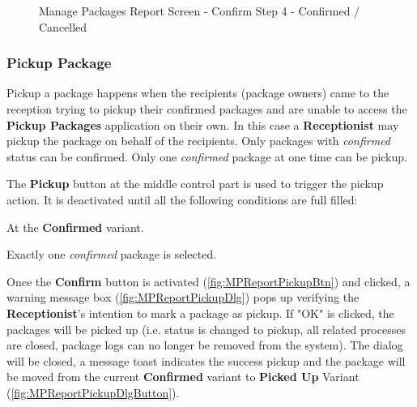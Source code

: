 \begin{figure}[H]
	\centering
	\hspace{5pt}
    \caption{Manage Packages Report Screen - Confirm Step 4 - Confirmed / Cancelled}
	\label{fig:MPReportConfirmDlgButton}
\end{figure}

\subsubsection{Pickup Package}
\label{subsubsec:MPpickup}

Pickup a package happens when the recipients (package owners) came to the reception trying to pickup their confirmed packages and are unable to access the \textbf{Pickup Packages} application on their own. In this case a \textbf{Receptionist} may pickup the package on behalf of the recipients. Only packages with \textit{confirmed} status can be confirmed. Only one \textit{confirmed} package at one time can be pickup.

The \textbf{Pickup} button at the middle control part is used to trigger the pickup action. It is deactivated until all the following conditions are full filled:

\begin{compactenum}
    \item At the \textbf{Confirmed} variant.
    \item Exactly one \textit{confirmed} package is selected.
\end{compactenum}

\bigskip
Once the \textbf{Confirm} button is activated (\autoref{fig:MPReportPickupBtn}) and clicked, a warning message box (\autoref{fig:MPReportPickupDlg}) pops up verifying the \textbf{Receptionist}'s intention to mark a package as pickup. If "OK" is clicked, the packages will be picked up (i.e. status is changed to pickup, all related processes are closed, package logs can no longer be removed from the system). The dialog will be closed, a message toast indicates the success pickup and the package will be moved from the current \textbf{Confirmed} variant to \textbf{Picked Up} Variant (\autoref{fig:MPReportPickupDlgButton}). 


